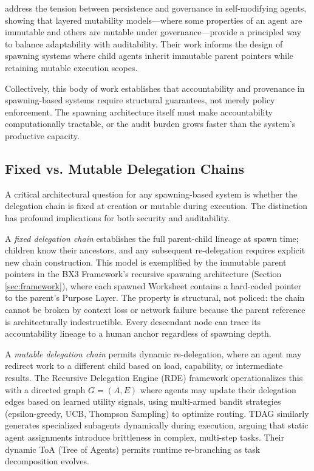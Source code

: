  address the tension between persistence and governance in self-modifying agents, showing that layered mutability models---where some properties of an agent are immutable and others are mutable under governance---provide a principled way to balance adaptability with auditability. Their work informs the design of spawning systems where child agents inherit immutable parent pointers while retaining mutable execution scopes.

Collectively, this body of work establishes that accountability and provenance in spawning-based systems require structural guarantees, not merely policy enforcement. The spawning architecture itself must make accountability computationally tractable, or the audit burden grows faster than the system's productive capacity.

\subsection{Fixed vs. Mutable Delegation Chains}
\label{sec:delegation-chains}

A critical architectural question for any spawning-based system is whether the delegation chain is fixed at creation or mutable during execution. The distinction has profound implications for both security and auditability.

A \emph{fixed delegation chain} establishes the full parent-child lineage at spawn time; children know their ancestors, and any subsequent re-delegation requires explicit new chain construction. This model is exemplified by the immutable parent pointers in the BX3 Framework's recursive spawning architecture (Section \ref{sec:framework}), where each spawned Worksheet contains a hard-coded pointer to the parent's Purpose Layer. The property is structural, not policed: the chain cannot be broken by context loss or network failure because the parent reference is architecturally indestructible. Every descendant node can trace its accountability lineage to a human anchor regardless of spawning depth.

A \emph{mutable delegation chain} permits dynamic re-delegation, where an agent may redirect work to a different child based on load, capability, or intermediate results. The Recursive Delegation Engine (RDE) framework \citep{intelligent2025} operationalizes this with a directed graph $G = (A, E)$ where agents may update their delegation edges based on learned utility signals, using multi-armed bandit strategies (epsilon-greedy, UCB, Thompson Sampling) to optimize routing. TDAG \citep{tdag2024} similarly generates specialized subagents dynamically during execution, arguing that static agent assignments introduce brittleness in complex, multi-step tasks. Their dynamic ToA (Tree of Agents) permits runtime re-branching as task decomposition evolves.

